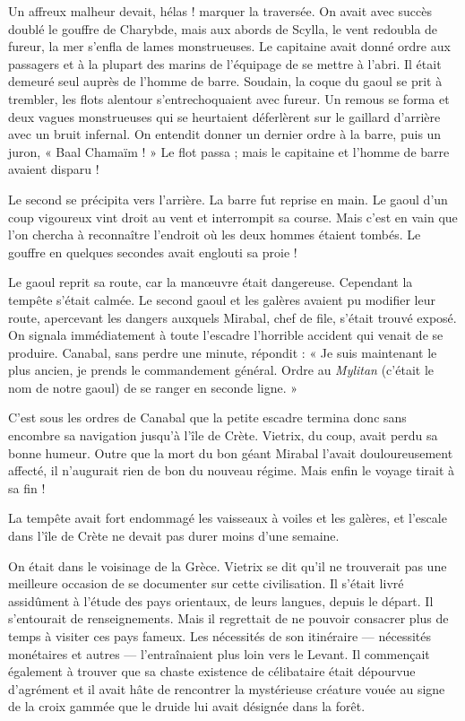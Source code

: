 \documentclass[a4paper, 11pt, oneside, polutonikogreek, french]{article}
\begin{document}
Un affreux malheur devait, hélas ! marquer la traversée. On avait avec succès doublé le gouffre de Charybde, mais aux abords de Scylla, le vent redoubla de fureur, la mer s'enfla de lames monstrueuses. Le capitaine avait donné ordre aux passagers et à la plupart des marins de l'équipage de se mettre à l'abri. Il était demeuré seul auprès de l'homme de barre. Soudain, la coque du gaoul se prit à trembler, les flots alentour s'entrechoquaient avec fureur. Un remous se forma et deux vagues monstrueuses qui se heurtaient déferlèrent sur le gaillard d'arrière avec un bruit infernal. On entendit donner un dernier ordre à la barre, puis un juron, « Baal Chamaïm ! » Le flot passa ; mais le capitaine et l'homme de barre avaient disparu !

Le second se précipita vers l'arrière. La barre fut reprise en main. Le gaoul d'un coup vigoureux vint droit au vent et interrompit sa course. Mais c'est en vain que l'on chercha à reconnaître l'endroit où les deux hommes étaient tombés. Le gouffre en quelques secondes avait englouti sa proie !

Le gaoul reprit sa route, car la manœuvre était dangereuse. Cependant la tempête s'était calmée. Le second gaoul et les galères avaient pu modifier leur route, apercevant les dangers auxquels Mirabal, chef de file, s'était trouvé exposé. On signala immédiatement à toute l'escadre l'horrible accident qui venait de se produire. Canabal, sans perdre une minute, répondit : « Je suis maintenant le plus ancien, je prends le commandement général. Ordre au \emph{Mylitan} (c'était le nom de notre gaoul) de se ranger en seconde ligne. »

C'est sous les ordres de Canabal que la petite escadre termina donc sans encombre sa navigation jusqu'à l'île de Crète. Vietrix, du coup, avait perdu sa bonne humeur. Outre que la mort du bon géant Mirabal l'avait douloureusement affecté, il n'augurait rien de bon du nouveau régime. Mais enfin le voyage tirait à sa fin !

La tempête avait fort endommagé les vaisseaux à voiles et les galères, et l'escale dans l'île de Crète ne devait pas durer moins d'une semaine.

On était dans le voisinage de la Grèce. Vietrix se dit qu'il ne trouverait pas une meilleure occasion de se documenter sur cette civilisation. Il s'était livré assidûment à l'étude des pays orientaux, de leurs langues, depuis le départ. Il s'entourait de renseignements. Mais il regrettait de ne pouvoir consacrer plus de temps à visiter ces pays fameux. Les nécessités de son itinéraire --- nécessités monétaires et autres --- l'entraînaient plus loin vers le Levant. Il commençait également à trouver que sa chaste existence de célibataire était dépourvue d'agrément et il avait hâte de rencontrer la mystérieuse créature vouée au signe de la croix gammée que le druide lui avait désignée dans la forêt.
\end{document}
